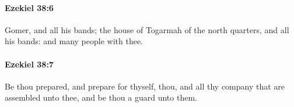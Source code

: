 		\paragraph{Ezekiel 38:6} %
			\label{EZEKIEL-38-6}

			Gomer, and all his bands; the house of Togarmah of the north quarters, and all his bands: and many people with thee.


		\paragraph{Ezekiel 38:7} %
			\label{EZEKIEL-38-7}

			Be thou prepared, and prepare for thyself, thou, and all thy company that are assembled unto thee, and be thou a guard unto them.


